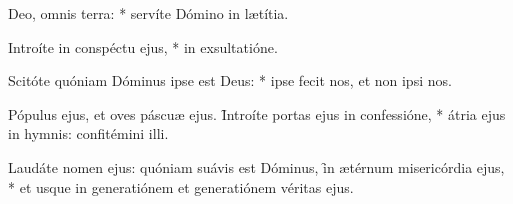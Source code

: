 \begin{psalmus}

 Deo, omnis terra: * servíte Dómino in lætítia.

Introíte in conspéctu ejus, * in exsultatióne.

Scitóte quóniam Dóminus ipse est Deus: * ipse fecit nos, et non ipsi nos.

Pópulus ejus, et oves páscuæ ejus. \f Introíte portas ejus in confessióne, * átria ejus in hymnis: confitémini illi.

Laudáte nomen ejus: quóniam suávis est Dóminus, \f in ætérnum misericórdia ejus, * et usque in generatiónem et generatiónem véritas ejus.

\end{psalmus}
